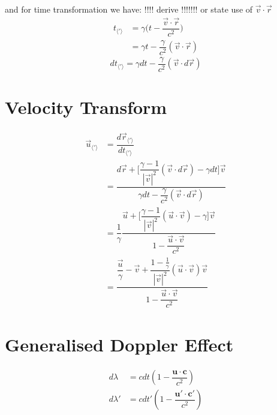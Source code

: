 and for time transformation we have: !!!! derive !!!!!!! or state use of $\vec{v}\cdot\vec{r}$
\begin{equation}%
    \begin{aligned}
    t_{\langle ' \rangle}  &= \gamma \bigg( t - \dfrac{\vec{v}\cdot\vec{r}}{c^2}\bigg) \\
    &= \gamma t - \dfrac{\gamma}{c^2}(\vec{v}\cdot\vec{r})
    \end{aligned}
\end{equation}%
\begin{equation}%
    dt_{\langle ' \rangle}  = \gamma dt - \dfrac{\gamma}{c^2}(\vec{v}\cdot d\vec{r})
\end{equation}%

\section{Velocity Transform}
\begin{equation}%
\label{Generalised velocity transform}
    \begin{aligned}
    \vec{u}_{\langle ' \rangle}  &= \dfrac{d\vec{r}_{\langle ' \rangle} }{dt_{\langle ' \rangle} }\\
    &= \dfrac{d\vec{r} + \Big[ \dfrac{\gamma-1}{|\vec{v}|^2}(\vec{v}\cdot d\vec{r})- \gamma dt\Big]\vec{v}}{\gamma dt - \dfrac{\gamma}{c^2}(\vec{v}\cdot d\vec{r})} \\
    &= \dfrac{1}{\gamma} \dfrac{\vec{u} + \Big[\dfrac{\gamma-1}{|\vec{v}|^2}(\vec{u}\cdot \vec{v})- \gamma \Big] \vec{v}}{1 - \dfrac{\vec{u}\cdot\vec{v}}{c^2}}\\
    &= \dfrac{\dfrac{\vec{u}}{\gamma} - \vec{v} + \dfrac{1-\frac{1}{\gamma}}{|\vec{v}|^2}(\vec{u}\cdot \vec{v})\vec{v} }{1 - \dfrac{\vec{u}\cdot\vec{v}}{c^2}}
    \end{aligned}
\end{equation}%

\section{Generalised Doppler Effect}

\begin{equation}
	\begin{aligned}
		d\lambda  & = c dt \left( 1 - \dfrac{\mathbf{u} \cdot \mathbf{c}}{c^2} \right)    \\
		d\lambda' & = c dt' \left( 1 - \dfrac{\mathbf{u}'\cdot \mathbf{c}'}{c^2} \right)
	\end{aligned}
\end{equation}


